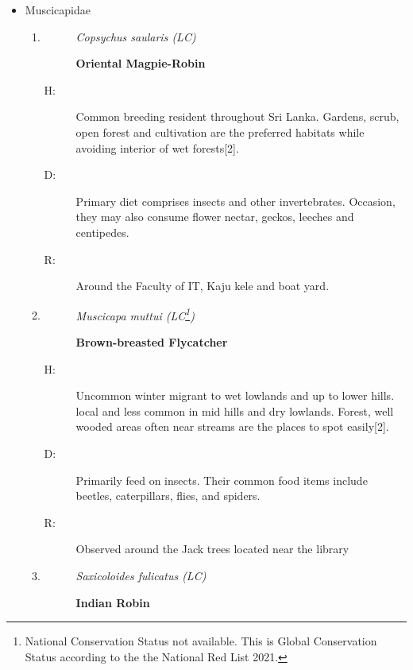 \begin{itemize}
\begin{enumerate}
\end{enumerate}%
\item%
Muscicapidae%
\begin{enumerate}%
\item%
\begin{description}%
\item[]%
\textit{Copsychus saularis (LC)}%
\item[]%
\textbf{Oriental Magpie{-}Robin}%
\end{description}%
\begin{description}%
\item[H: ]%
Common breeding resident throughout Sri Lanka. Gardens, scrub, open forest and cultivation are the preferred habitats while avoiding interior of wet forests{[}2{]}.%
\item[D: ]%
Primary diet comprises insects and other invertebrates. Occasion, they may also consume flower nectar, geckos, leeches and centipedes.%
\item[R: ]%
Around the Faculty of IT, Kaju kele and boat yard.%
\end{description}%
\item%
\begin{description}%
\item[]%
\textit{Muscicapa muttui (LC\footnote{National Conservation Status not available. This is Global Conservation Status according to the the National Red List 2021.})}%
\item[]%
\textbf{Brown{-}breasted Flycatcher}%
\end{description}%
\begin{description}%
\item[H: ]%
Uncommon winter migrant to wet lowlands and up to lower hills. local and less common in mid hills and dry lowlands. Forest, well wooded areas often near streams are the places to spot easily{[}2{]}.%
\item[D: ]%
Primarily feed on insects. Their common food items include beetles, caterpillars, flies, and spiders.%
\item[R: ]%
Observed around the Jack trees located near the library%
\end{description}%
\item%
\begin{description}%
\item[]%
\textit{Saxicoloides fulicatus (LC)}%
\item[]%
\textbf{Indian Robin}%
\end{description}%
\begin{description}%

\end{description}
\end{enumerate}
\end{itemize}
